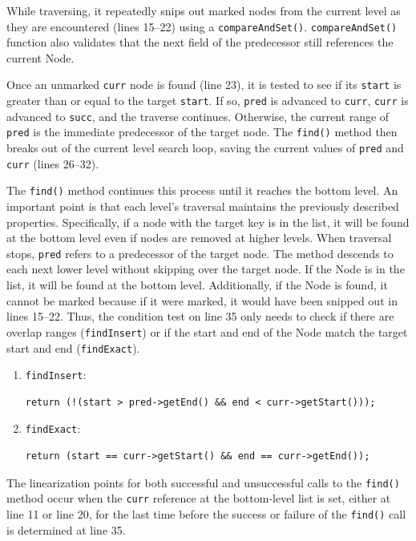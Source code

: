 While traversing, it repeatedly snips out marked nodes from the current level as they are encountered (lines 15--22) using a \texttt{compareAndSet()}.
\texttt{compareAndSet()} function also validates that the next field of the predecessor still references the current Node.

Once an unmarked \texttt{curr} node is found (line 23), it is tested to see if its \texttt{start} is greater than or equal to the target \texttt{start}.
If so, \texttt{pred} is advanced to \texttt{curr}, \texttt{curr} is advanced to \texttt{succ}, and the traverse continues.
Otherwise, the current range of \texttt{pred} is the immediate predecessor of the target node.
The \texttt{find()} method then breaks out of the current level search loop, saving the current values of \texttt{pred} and \texttt{curr} (lines 26--32).

The \texttt{find()} method continues this process until it reaches the bottom level.
An important point is that each level's traversal maintains the previously described properties.
Specifically, if a node with the target key is in the list, it will be found at the bottom level even if nodes are removed at higher levels.
When traversal stops, \texttt{pred} refers to a predecessor of the target node.
The method descends to each next lower level without skipping over the target node.
If the Node is in the list, it will be found at the bottom level.
Additionally, if the Node is found, it cannot be marked because if it were marked, it would have been snipped out in lines 15--22.
Thus, the condition test on line 35 only needs to check if there are overlap ranges (\texttt{findInsert}) or if the start and end of the Node match the target start and end (\texttt{findExact}).
\begin{enumerate}
    \item \texttt{findInsert}:
    \begin{lstlisting}[style=nonum, label={}]
 return (!(start > pred->getEnd() && end < curr->getStart()));
    \end{lstlisting}
    \item \texttt{findExact}:
    \begin{lstlisting}[style=nonum, label={}]
 return (start == curr->getStart() && end == curr->getEnd());
    \end{lstlisting}
\end{enumerate}

The linearization points for both successful and unsuccessful calls to the \texttt{find()} method occur when the \texttt{curr} reference at the bottom-level list is set, either at line 11 or line 20, for the last time before the success or failure of the \texttt{find()} call is determined at line 35.

